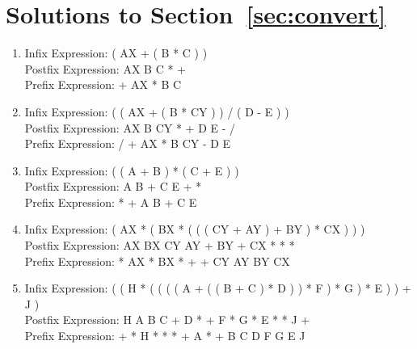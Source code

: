 \documentclass[11pt,letterpaper]{article}
\begin{document}
\newpage
\section{Solutions to Section~\ref{sec:convert}}

\begin{enumerate}
\item
Infix Expression: ( AX + ( B * C ) ) 
\\
Postfix Expression: AX B C * +
\\
Prefix Expression: + AX * B C

\item
Infix Expression: ( ( AX + ( B * CY ) ) / ( D - E ) )
\\
Postfix Expression: AX B CY * + D E - /
\\
Prefix Expression: / + AX * B CY - D E

\item
Infix Expression: ( ( A + B ) * ( C + E ) ) 
\\
Postfix Expression: A B + C E + *
\\
Prefix Expression: * + A B + C E

\item
Infix Expression: ( AX * ( BX * ( ( ( CY + AY ) + BY ) * CX ) ) ) 
\\
Postfix Expression: AX BX CY AY + BY + CX * * *
\\
Prefix Expression: * AX * BX * + + CY AY BY CX

\item
Infix Expression: ( ( H * ( ( ( ( A + ( ( B + C ) * D ) ) * F ) * G ) * E ) ) + J ) 
\\
Postfix Expression: H A B C + D * + F * G * E * * J +
\\
Prefix Expression: + * H * * * + A * + B C D F G E J
\end{enumerate}
\end{document}
